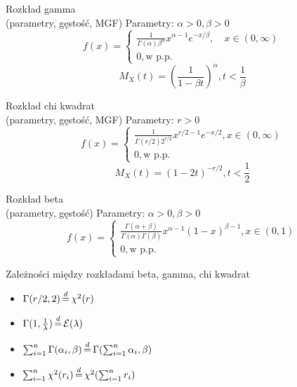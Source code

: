 \documentclass[avery5371, grid, frame]{flashcards}
\begin{document}
\begin{flashcard}[Definicja]{Rozkład gamma \\ (parametry, gęstość, MGF)}
    Parametry: $\alpha > 0, \beta > 0$
    $$ f(x) =
    \begin{cases}
        \frac{1}{\Gamma(\alpha)\beta^\alpha} x^{\alpha-1} e^{-x/\beta}, \quad x \in (0, \infty) \\
        0, \text{w p.p.}
    \end{cases} $$
    $$M_X(t) = \left ( \frac{1}{1-\beta t}\right )^\alpha, t < \frac{1}{\beta}$$
\end{flashcard}

\begin{flashcard}[Definicja]{Rozkład chi kwadrat \\ (parametry, gęstość, MGF)}
    Parametry: $r > 0$
    $$ f(x) =
    \begin{cases}
        \frac{1}{\Gamma(r/2)2^{r/2}} x^{r/2 - 1} e^{-x/2}, x \in (0, \infty) \\
        0, \text{w p.p.}
    \end{cases} $$
    $$M_X(t) = (1-2t)^{-r/2}, t < \frac{1}{2}$$
\end{flashcard}

\begin{flashcard}[Definicja]{Rozkład beta \\ (parametry, gęstość)}
    Parametry: $\alpha > 0, \beta > 0$
    $$ f(x) =
    \begin{cases}
        \frac{\Gamma(\alpha + \beta)}{\Gamma(\alpha) \Gamma(\beta)} x^{\alpha - 1} (1-x)^{\beta - 1}, x \in (0, 1) \\
        0, \text{w p.p.}
    \end{cases} $$
\end{flashcard}

\begin{flashcard}[Twierdzenie]{Zależności między rozkładami beta, gamma, chi kwadrat}
\begin{small}
    \begin{itemize}
        \item $\Gamma (r/2, 2) \,{\buildrel d \over =}\, \chi^2 (r)$
        \item $\Gamma(1, \frac{1}{\lambda}) \,{\buildrel d \over =}\, \mathcal{E}(\lambda) $
        \item $\sum_{i = 1}^{n} \Gamma(\alpha_i, \beta) \,{\buildrel d \over =}\, \Gamma(\sum_{i=1}^{n} \alpha_i, \beta) $
        \item $\sum_{i=1}^{n} \chi^2(r_i) \,{\buildrel d \over =}\, \chi^2 (\sum_{i=1}^{n} r_i)$
    \end{itemize}
\end{small}
\end{flashcard}
\end{document}
